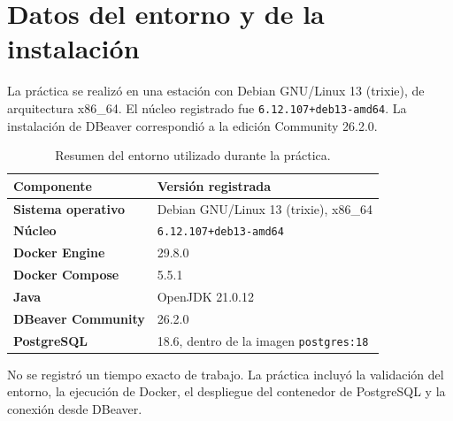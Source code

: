 \section{Datos del entorno y de la instalación}

La práctica se realizó en una estación con Debian GNU/Linux 13 (trixie), de
arquitectura x86\_64. El núcleo registrado fue
\texttt{6.12.107+deb13-amd64}. La instalación de DBeaver correspondió a la
edición Community 26.2.0.

\begin{table}[H]
  \centering
  \begin{tabularx}{\textwidth}{>{\bfseries}lX}
    \toprule
    Componente & Versión registrada \\
    \midrule
    Sistema operativo & Debian GNU/Linux 13 (trixie), x86\_64 \\
    Núcleo & \texttt{6.12.107+deb13-amd64} \\
    Docker Engine & 29.8.0 \\
    Docker Compose & 5.5.1 \\
    Java & OpenJDK 21.0.12 \\
    DBeaver Community & 26.2.0 \\
    PostgreSQL & 18.6, dentro de la imagen \texttt{postgres:18} \\
    \bottomrule
  \end{tabularx}
  \caption{Resumen del entorno utilizado durante la práctica.}
\end{table}


No se registró un tiempo exacto de trabajo. La práctica incluyó la validación
del entorno, la ejecución de Docker, el despliegue del contenedor de
PostgreSQL y la conexión desde DBeaver.

